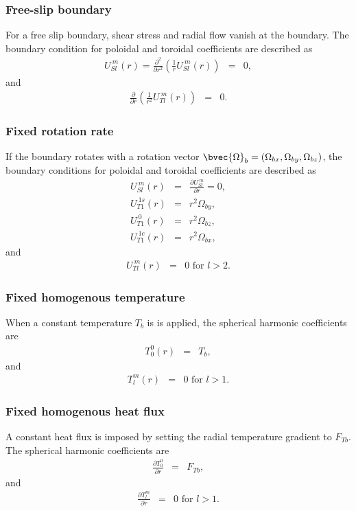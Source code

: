 \subsubsection{Free-slip boundary}
For a free slip boundary, shear stress and radial flow vanish at the boundary. The boundary condition for poloidal and toroidal coefficients are described as
%
\begin{eqnarray}
U_{Sl}^{\ m}(r) = \frac{\partial^2}{\partial r^2} \left( \frac{1}{r} U_{Sl}^{\ m}(r) \right) & = & 0,
\nonumber
\end{eqnarray}
%
and 
%
\begin{eqnarray}
\frac{\partial}{\partial r} \left( \frac{1}{r^2} U_{Tl}^{\ m}(r) \right) & = & 0.
\nonumber
\end{eqnarray}
%
\subsubsection{Fixed rotation rate}
If the boundary rotates with a rotation vector $\bvec{\Omega}_{b} = \left(\Omega_{bx}, \Omega_{by}, \Omega_{bz}\right)$, the boundary conditions for poloidal and toroidal coefficients are described as
%
\begin{eqnarray}
U_{Sl}^{\ m}(r) & = & \frac{\partial U_{Sl}^{\ m}}{\partial r} = 0,
\nonumber \\
U_{T1}^{\ 1s}(r) & = & r^{2} \Omega_{by},
\nonumber \\
U_{T1}^{\ 0}(r) & = &  r^{2} \Omega_{bz},
\nonumber \\
U_{T1}^{\ 1c}(r) & = & r^{2} \Omega_{bx},
\nonumber
\end{eqnarray}
%
and 
%
\begin{eqnarray}
U_{Tl}^{\ m}(r) & = & 0 \mbox{ for } l > 2.
\nonumber
\end{eqnarray}
%
\subsubsection{Fixed homogenous temperature}
When a constant temperature $T_{b}$ is is applied, the spherical harmonic coefficients are
%
\begin{eqnarray}
T_{0}^{0}(r) & = &  T_{b},
\nonumber
\end{eqnarray}
%
and 
%
\begin{eqnarray}
T_{l}^{m}(r) & = & 0 \mbox{ for } l > 1.
\nonumber
\end{eqnarray}
%
\subsubsection{Fixed homogenous heat flux}
A constant heat flux is imposed by setting the radial temperature gradient to $F_{Tb}$. The spherical harmonic coefficients are
%
\begin{eqnarray}
\frac{\partial T_{0}^{0}}{\partial r} & = &  F_{Tb},
\nonumber
\end{eqnarray}
%
and 
%
\begin{eqnarray}
\frac{\partial T_{l}^{m}}{\partial r} & = & 0 \mbox{ for } l > 1.
\nonumber
\end{eqnarray}
%
